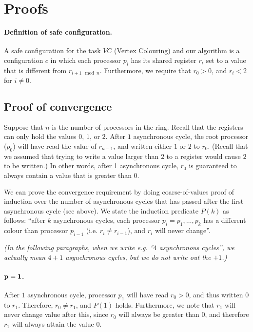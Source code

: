 \documentclass{article}
\begin{document}
\section*{Proofs}

\paragraph{Definition of safe configuration.}
A safe configuration for the task $VC$ (Vertex Colouring) and our algorithm is a configuration $c$ in which each processor $p_i$ has its shared register $r_i$ set to a value that is different from $r_{i + 1 \mod n}$. Furthermore, we require that $r_0 > 0$, and $r_i < 2$ for $i \neq 0$.

\subsection*{Proof of convergence}
Suppose that $n$ is the number of processors in the ring. Recall that the registers can only hold the values $0$, $1$, or $2$. After $1$ asynchronous cycle, the root processor ($p_0$) will have read the value of $r_{n - 1}$, and written either $1$ or $2$ to $r_0$. (Recall that we assumed that trying to write a value larger than $2$ to a register would cause $2$ to be written.) In other words, after 1 asynchronous cycle, $r_0$ is guaranteed to always contain a value that is greater than $0$.

We can prove the convergence requirement by doing coarse-of-values proof of induction over the number of asynchronous cycles that has passed after the first asynchronous cycle (see above). We state the induction predicate $P(k)$ as follows: ``after $k$ asynchronous cycles, each processor $p_i = p_1, \ldots, p_k$ has a different colour than processor $p_{i - 1}$ (i.e. $r_i \neq r_{i -1 }$), and $r_i$ will never change''.

\emph{(In the following paragraphs, when we write e.g. ``$4$ asynchronous cycles'', we actually mean $4 + 1$ asynchronous cycles, but we do not write out the $+ 1$.)}

\paragraph{$\bf p = 1$.}
After $1$ asynchronous cycle, processor $p_1$ will have read $r_0 > 0$, and thus written $0$ to $r_1$. Therefore, $r_0 \neq r_1$, and $P(1)$ holds. Furthermore, we note that $r_1$ will never change value after this, since $r_0$ will always be greater than $0$, and therefore $r_1$ will always attain the value $0$.
\end{document}
